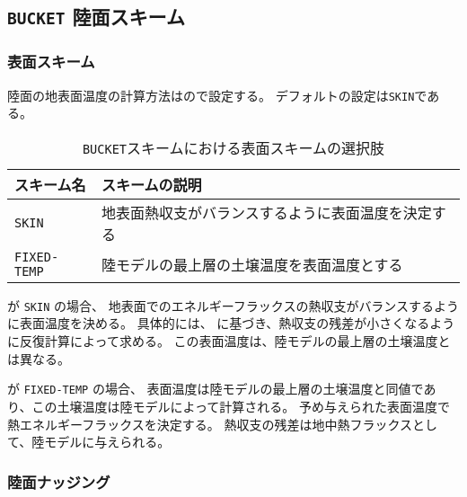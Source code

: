 \subsection{\texttt{BUCKET} 陸面スキーム}
\subsubsection{表面スキーム}

陸面の地表面温度の計算方法はので設定する。
デフォルトの設定は\verb|SKIN|である。
%
\begin{table}[hbt]
\begin{center}
  \caption{\texttt{BUCKET}スキームにおける表面スキームの選択肢}
  \label{tab:nml_land_sfc}
  \begin{tabularx}{150mm}{lX} \hline
    \rowcolor[gray]{0.9}  スキーム名 & スキームの説明 \\ \hline
      \verb|SKIN|       & 地表面熱収支がバランスするように表面温度を決定する \\
      \verb|FIXED-TEMP| & 陸モデルの最上層の土壌温度を表面温度とする \\
    \hline
  \end{tabularx}
\end{center}
\end{table}

 が \verb|SKIN| の場合、
地表面でのエネルギーフラックスの熱収支がバランスするように表面温度を決める。
具体的には、\citet{tomita_2009} に基づき、熱収支の残差が小さくなるように反復計算によって求める。
この表面温度は、陸モデルの最上層の土壌温度とは異なる。


 が \verb|FIXED-TEMP| の場合、
表面温度は陸モデルの最上層の土壌温度と同値であり、この土壌温度は陸モデルによって計算される。
予め与えられた表面温度で熱エネルギーフラックスを決定する。
熱収支の残差は地中熱フラックスとして、陸モデルに与えられる。


\subsubsection{陸面ナッジング}

